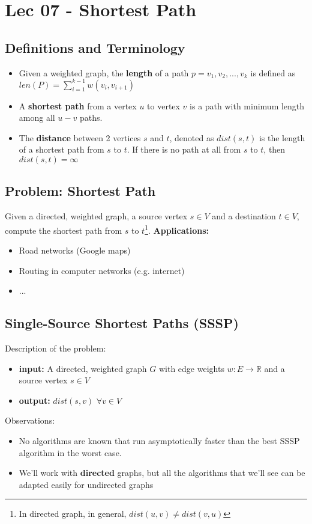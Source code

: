 \chapter{Lec 07 - Shortest Path}

\section{Definitions and Terminology}
\begin{itemize}
    \item Given a weighted graph, the \textbf{length} of a path $p = v_1, v_2, ..., v_k$ is defined as $len(P)=\sum_{i=1}^{k-1}w(v_i, v_{i+1})$

    \item A \textbf{shortest path} from a vertex $u$ to vertex $v$ is a path with minimum length among all $u-v$ paths.

    \item The \textbf{distance} between 2 vertices $s$ and $t$, denoted as $dist(s, t)$ is the length of a shortest path from $s$ to $t$. If there is no path at all from $s$ to $t$, then $dist(s, t) = \infty$
\end{itemize}

\section{Problem: Shortest Path}
Given a directed, weighted graph, a source vertex $s \in V$ and a destination $t \in V$, compute the shortest path from $s$ to $t$\footnote{In directed graph, in general, $dist(u, v) \neq dist(v, u)$}.\newline\newline
\textbf{Applications:}
\begin{itemize}
    \item Road networks (Google maps)
    \item Routing in computer networks (e.g. internet)
    \item ...
\end{itemize}

\section{Single-Source Shortest Paths (SSSP)}
Description of the problem:
\begin{itemize}
    \item \textbf{input:} A directed, weighted graph $G$ with edge weights $w: E \rightarrow \mathbb{R}$ and a source vertex $s \in V$

    \item \textbf{output:} $dist(s, v) \,\, \forall v \in V$
\end{itemize}
Observations:
\begin{itemize}
    \item No algorithms are known that run asymptotically faster than the best SSSP algorithm in the worst case.

    \item We'll work with \textbf{directed} graphs, but all the algorithms that we'll see can be adapted easily for undirected graphs 
\end{itemize}
